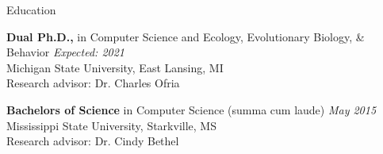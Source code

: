 \begin{rSection}{Education}

{\bf Dual Ph.D.,} in Computer Science and Ecology, Evolutionary Biology, \& Behavior \hfill {\em Expected: 2021} \\
Michigan State University, East Lansing, MI \\
Research advisor: Dr. Charles Ofria

{\bf Bachelors of Science} in Computer Science (summa cum laude) \hfill {\em May 2015} \\
Mississippi State University, Starkville, MS \\
Research advisor: Dr. Cindy Bethel

\end{rSection}
